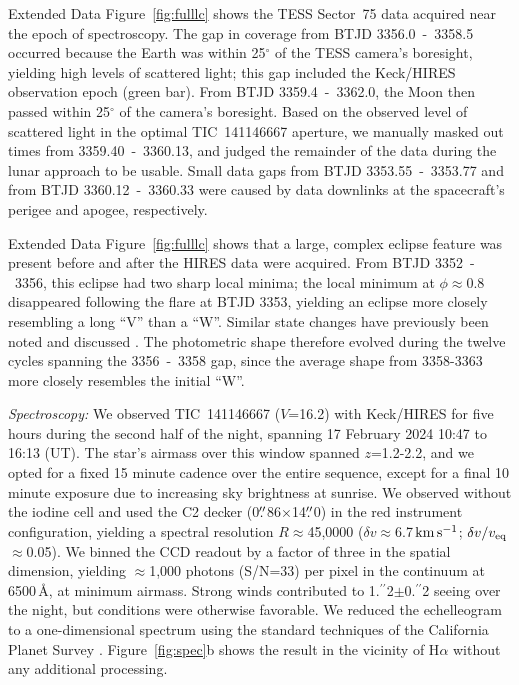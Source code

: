 \documentclass{nature3}
\newcommand{\farcs}{\mbox{\ensuremath{.\!\!^{\prime\prime}}}}%
\newcommand{\kms}{\ensuremath{\rm km\,s^{-1}}}
\begin{document}
\begin{methods}
Extended Data Figure~\ref{fig:fulllc} shows the TESS Sector~75 data acquired near
the epoch of spectroscopy.  The gap in coverage from BTJD
3356.0~-~3358.5 occurred because the Earth was within 25$^\circ$ of
the TESS camera's boresight, yielding high levels of scattered light;
this gap included the Keck/HIRES observation epoch (green bar).  From
BTJD 3359.4~-~3362.0, the Moon then passed within 25$^\circ$ of the
camera's boresight.  Based on the observed level of scattered light in
the optimal TIC~141146667 aperture, we manually masked out times from
3359.40~-~3360.13, and judged the remainder of the data during the
lunar approach to be usable.  Small data gaps from BTJD
3353.55~-~3353.77 and from BTJD 3360.12~-~3360.33 were caused by data
downlinks at the spacecraft's perigee and apogee, respectively.

Extended Data Figure~\ref{fig:fulllc} shows that a large, complex eclipse
feature was present before and after the HIRES data were
acquired.  From BTJD 3352~-~3356, this eclipse had two sharp local
minima;  the local minimum at $\phi$$\approx$0.8 disappeared following
the flare at BTJD 3353, yielding an eclipse more closely resembling a
long ``V'' than a ``W''.  Similar state changes have previously been
noted and discussed \cite{Stauffer2017,Bouma2024}.  The photometric
shape therefore evolved during the twelve cycles spanning the
3356~-~3358 gap, since the average shape from 3358-3363 more
closely resembles the initial ``W''.



{\it Spectroscopy:}
We observed TIC~141146667 ($V$=16.2) with Keck/HIRES for five hours
during the second half of the night, spanning 17 February 2024 10:47
to 16:13 (UT).
The star's airmass over this window spanned $z$=1.2-2.2, and we opted
for a fixed 15 minute cadence over the entire sequence, except for a
final 10 minute exposure due to increasing sky brightness at sunrise.
We observed without the iodine cell and used the C2 decker
(0$\farcs$86$\times$14$\farcs$0) in the red instrument configuration,
yielding a spectral resolution $R$$\approx$45{,}0000 ($\delta
v$$\approx$6.7\,\kms; $\delta v / v_{\rm eq}$$\approx$0.05).  We binned
the CCD readout by a factor of three in the spatial dimension, yielding
$\approx$1,000 photons (S/N=33) per pixel in the continuum at 6500\,\AA,
at minimum airmass.  Strong winds contributed to 1\farcs2$\pm$0\farcs2
seeing over the night, but conditions were otherwise favorable.  We
reduced the echelleogram to a one-dimensional spectrum using the
standard techniques of the California Planet Survey \cite{Howard2010}.
Figure~\ref{fig:spec}b shows the result in the vicinity of H$\alpha$
without any additional processing.



\end{methods}
\end{document}
